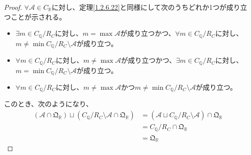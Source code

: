 \documentclass[dvipdfmx]{jsarticle}
\begin{document}
\begin{proof}
$\mathcal{\forall A \in}C_{\mathbb{R}}$に対し、定理\ref{1.2.6.22}と同様にして次のうちどれか1つが成り立つことが示される。
\begin{itemize}
\item
  $\exists m \in C_{\mathbb{Q}} /R_{C} $に対し、$m = \max\mathcal{A}$が成り立つかつ、$\forall m \in C_{\mathbb{Q}} /R_{C} $に対し、$m \neq \min{C_{\mathbb{Q}} /R_{C} \mathcal{\setminus A}}$が成り立つ。
\item
  $\forall m \in C_{\mathbb{Q}} /R_{C} $に対し、$m \neq \max\mathcal{A}$が成り立つかつ、$\exists m \in C_{\mathbb{Q}} /R_{C} $に対し、$m = \min{C_{\mathbb{Q}} /R_{C} \mathcal{\setminus A}}$が成り立つ。
\item
  $\forall m \in C_{\mathbb{Q}} /R_{C} $に対し、$m \neq \max\mathcal{A}$かつ$m \neq \min{C_{\mathbb{Q}} /R_{C} \mathcal{\setminus A}}$が成り立つ。
\end{itemize}
このとき、次のようになり、
\begin{align*}
\left( \mathcal{A \cap}\mathfrak{Q}_{\mathbb{R}} \right) \sqcup \left( C_{\mathbb{Q}} /R_{C} \mathcal{\setminus A \cap}\mathfrak{Q}_{\mathbb{R}} \right) &= \left( \mathcal{A \sqcup}C_{\mathbb{Q}} /R_{C} \mathcal{\setminus A} \right) \cap \mathfrak{Q}_{\mathbb{R}}\\
&= C_{\mathbb{Q}} /R_{C}  \cap \mathfrak{Q}_{\mathbb{R}}\\
&= \mathfrak{Q}_{\mathbb{R}}
\end{align*}

\end{proof}
\end{document}
